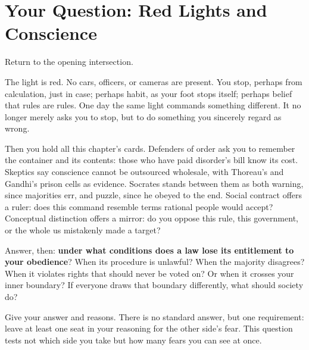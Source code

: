 \section{Your Question: Red Lights and Conscience}
Return to the opening intersection.

The light is red. No cars, officers, or cameras are present. You stop, perhaps from calculation, just in case; perhaps habit, as your foot stops itself; perhaps belief that rules are rules. One day the same light commands something different. It no longer merely asks you to stop, but to do something you sincerely regard as wrong.

Then you hold all this chapter's cards. Defenders of order ask you to remember the container and its contents: those who have paid disorder's bill know its cost. Skeptics say conscience cannot be outsourced wholesale, with Thoreau's and Gandhi's prison cells as evidence. Socrates stands between them as both warning, since majorities err, and puzzle, since he obeyed to the end. Social contract offers a ruler: does this command resemble terms rational people would accept? Conceptual distinction offers a mirror: do you oppose this rule, this government, or the whole us mistakenly made a target?

Answer, then: \textbf{under what conditions does a law lose its entitlement to your obedience}? When its procedure is unlawful? When the majority disagrees? When it violates rights that should never be voted on? Or when it crosses your inner boundary? If everyone draws that boundary differently, what should society do?

Give your answer and reasons. There is no standard answer, but one requirement: leave at least one seat in your reasoning for the other side's fear. This question tests not which side you take but how many fears you can see at once.
